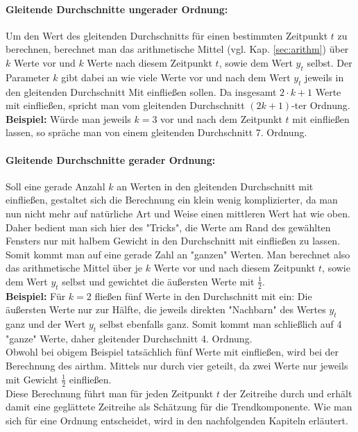 \documentclass[a4paper]{article}
\newcommand\dangersign[1][2ex]{%
  \renewcommand\stacktype{L}%
  \scaleto{\stackon[1.3pt]{\color{red}$\triangle$}{\tiny !}}{#1}%
}
\begin{document}
\paragraph{Gleitende Durchschnitte ungerader Ordnung:} Um den Wert des gleitenden Durchschnitts für einen bestimmten Zeitpunkt $t$ zu berechnen, berechnet man das arithmetische Mittel (vgl. Kap. \ref{sec:arithm}) über $k$ Werte vor und $k$ Werte nach diesem Zeitpunkt $t$, sowie dem Wert $y_t$ selbst. Der Parameter $k$ gibt dabei an wie viele Werte vor und nach dem Wert $y_t$ jeweils in den gleitenden Durchschnitt Mit einfließen sollen. Da insgesamt $2 \cdot k + 1$ Werte mit einfließen, spricht man vom gleitenden Durchschnitt $(2k + 1)$-ter Ordnung.\\
\textbf{Beispiel:} Würde man jeweils $k = 3$ vor und nach dem Zeitpunkt $t$ mit einfließen lassen, so spräche man von einem gleitenden Durchschnitt 7. Ordnung. 

\paragraph{Gleitende Durchschnitte gerader Ordnung:} Soll eine gerade Anzahl $k$ an Werten in den gleitenden Durchschnitt mit einfließen, gestaltet sich die Berechnung ein klein wenig komplizierter, da man nun nicht mehr auf natürliche Art und Weise einen mittleren Wert hat wie oben. Daher bedient man sich hier des "Tricks", die Werte am Rand des gewählten Fensters nur mit halbem Gewicht in den Durchschnitt mit einfließen zu lassen. Somit kommt man auf eine gerade Zahl an "ganzen" Werten. Man berechnet also das arithmetische Mittel über je $k$ Werte vor und nach diesem Zeitpunkt $t$, sowie dem Wert $y_t$ selbst und gewichtet die äußersten Werte mit $\frac{1}{2}$.\\
\textbf{Beispiel:} Für $k = 2$ fließen fünf Werte in den Durchschnitt mit ein: Die äußersten Werte nur zur Hälfte, die jeweils direkten "Nachbarn" des Wertes $y_t$ ganz und der Wert $y_t$ selbst ebenfalls ganz. Somit kommt man schließlich auf 4 "ganze" Werte, daher gleitender Durchschnitt 4. Ordnung.\\

\noindent \dangersign[3ex] Obwohl bei obigem Beispiel tatsächlich fünf Werte mit einfließen, wird bei der Berechnung des airthm. Mittels nur durch vier geteilt, da zwei Werte nur jeweils mit Gewicht $\frac{1}{2}$ einfließen.\\

\noindent Diese Berechnung führt man  für jeden Zeitpunkt $t$ der Zeitreihe durch und erhält damit eine geglättete Zeitreihe als Schätzung für die Trendkomponente. Wie man sich für eine Ordnung entscheidet, wird in den nachfolgenden Kapiteln erläutert.\\
\end{document}
